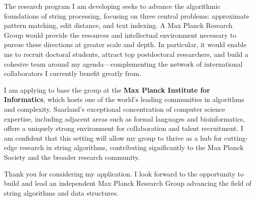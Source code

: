 \documentclass[11pt,a4paper,sans]{moderncv}
\begin{document}
The research program I am developing seeks to advance the algorithmic foundations of string processing, focusing on three central problems: approximate pattern matching, edit distance, and text indexing. A Max Planck Research Group would provide the resources and intellectual environment necessary to pursue these directions at greater scale and depth. In particular, it would enable me to recruit doctoral students, attract top postdoctoral researchers, and build a cohesive team around my agenda—complementing the network of international collaborators I currently benefit greatly from.

I am applying to base the group at the \textbf{Max Planck Institute for Informatics}, which hosts one of the world’s leading communities in algorithms and complexity. Saarland’s exceptional concentration of computer science expertise, including adjacent areas such as formal languages and bioinformatics, offers a uniquely strong environment for collaboration and talent recruitment. I am confident that this setting will allow my group to thrive as a hub for cutting-edge research in string algorithms, contributing significantly to the Max Planck Society and the broader research community.

Thank you for considering my application. I look forward to the opportunity to build and lead an independent Max Planck Research Group advancing the field of string algorithms and data structures.

\makeletterclosing

\end{document}
